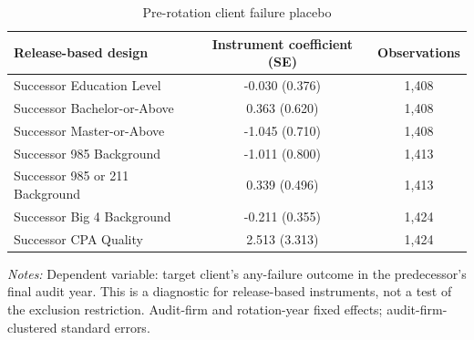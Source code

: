 \begin{table}[htbp]
\footnotesize
\centering
\caption{Pre-rotation client failure placebo}
\begin{threeparttable}
\begin{tabular}{p{}cc}
\toprule
Release-based design & Instrument coefficient (SE) & Observations \\
\midrule
Successor Education Level & -0.030 (0.376) & 1,408 \\
Successor Bachelor-or-Above & 0.363 (0.620) & 1,408 \\
Successor Master-or-Above & -1.045 (0.710) & 1,408 \\
Successor 985 Background & -1.011 (0.800) & 1,413 \\
Successor 985 or 211 Background & 0.339 (0.496) & 1,413 \\
Successor Big 4 Background & -0.211 (0.355) & 1,424 \\
Successor CPA Quality & 2.513 (3.313) & 1,424 \\
\bottomrule
\end{tabular}
\begin{tablenotes}\footnotesize
\item \raggedright \textit{Notes:} Dependent variable: target client's any-failure outcome in the predecessor's final audit year. This is a diagnostic for release-based instruments, not a test of the exclusion restriction. Audit-firm and rotation-year fixed effects; audit-firm-clustered standard errors.
\end{tablenotes}
\end{threeparttable}
\end{table}
